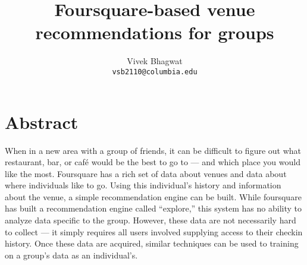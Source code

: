\documentclass[11pt]{article}
\title{Foursquare-based venue recommendations for groups}
\author{Vivek Bhagwat\\
{\tt vsb2110@columbia.edu}
}
\begin{document}
\maketitle

\section{Abstract}
When in a new area with a group of friends, it can be difficult to figure out what restaurant, bar, or caf\'e would be the best to go to ---
and which place you would like the most. Foursquare has a rich set of data about venues and data about where individuals like to go. 
Using this individual's history and information about the venue, a simple recommendation engine can be built. While foursquare 
has built a recommendation engine called ``explore,'' this system has no ability to analyze data specific to the group. However,
these data are not necessarily hard to collect --- it simply requires all users involved supplying access to their checkin history.
Once these data are acquired, similar techniques can be used to training on a group's data as an individual's.
\end{document}
